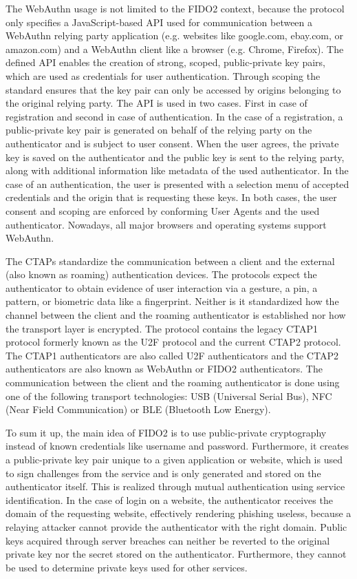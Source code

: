 \documentclass[runningheads]{llncs}
\begin{document}
The WebAuthn usage is not limited to the FIDO2 context, because the protocol only specifies a JavaScript-based API used for communication between a WebAuthn relying party application (e.g. websites like google.com, ebay.com, or amazon.com) and a WebAuthn client like a browser (e.g. Chrome, Firefox). The defined API enables the creation of strong, scoped, public-private key pairs, which are used as credentials for user authentication. Through scoping the standard ensures that the key pair can only be accessed by origins belonging to the original relying party. The API is used in two cases. First in case of registration and second in case of authentication. In the case of a registration, a public-private key pair is generated  on behalf of the relying party on the authenticator and is subject to user consent. When the user agrees, the private key is saved on the authenticator and the public key is sent to the relying party, along with additional information like metadata of the used authenticator. In the case of an authentication, the user is presented with a selection menu of accepted credentials and the origin that is requesting these keys. In both cases, the user consent and scoping are enforced by conforming User Agents and the used authenticator.\cite{000002} Nowadays, all major browsers and operating systems support WebAuthn.\cite{000001}

The CTAPs standardize the communication between a client and the external (also known as roaming) authentication devices. The protocols expect the authenticator to obtain evidence of user interaction via a gesture, a pin, a pattern, or biometric data like a fingerprint. Neither is it standardized how the channel between the client and the roaming authenticator is established nor how the transport layer is encrypted. The protocol contains the legacy CTAP1 protocol formerly known as the U2F protocol and the current CTAP2 protocol. The CTAP1 authenticators are also called U2F authenticators and the CTAP2 authenticators are also known as WebAuthn or FIDO2 authenticators. The communication between the client and the roaming authenticator is done using one of the following transport technologies: USB (Universal Serial Bus), NFC (Near Field Communication) or BLE (Bluetooth Low Energy). \cite{000003}\cite{274547}\cite{9099190}

To sum it up, the main idea of FIDO2 is to use public-private cryptography instead of known credentials like username and password. Furthermore, it creates a public-private key pair unique to a given application or website, which is used to sign challenges from the service and is only generated and stored on the authenticator itself. This is realized through mutual authentication using service identification. In the case of login on a website, the authenticator receives the domain of the requesting website, effectively rendering phishing useless, because a relaying attacker cannot provide the authenticator with the right domain.\cite{274610} Public keys acquired through server breaches can neither be reverted to the original private key nor the secret stored on the authenticator. Furthermore, they cannot be used to determine private keys used for other services.
\end{document}
